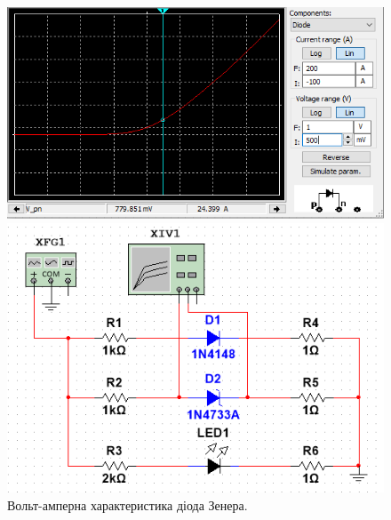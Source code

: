 \documentclass{article}
\begin{document}
\begin{normalsize}
	\begin{figure}[H]
		\begin{minipage}[t]{0.55\textwidth}
			\centering
			\includegraphics[width=\textwidth]{21}
		\end{minipage}
		\hfill
		\begin{minipage}[t]{0.35\textwidth}
			\centering
			\includegraphics[width=\textwidth]{22}
		\end{minipage}
		\caption{Вольт-амперна характеристика діода Зенера.}
	\end{figure}


\end{normalsize}
\end{document}
